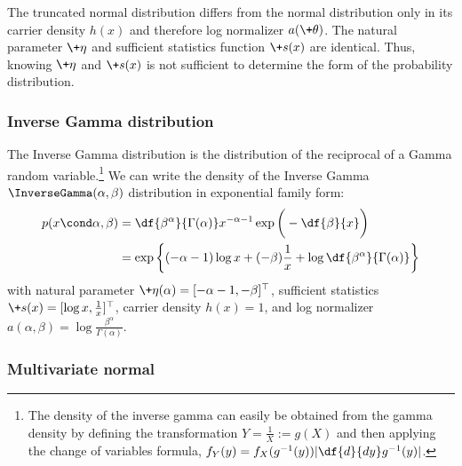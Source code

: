 \documentclass{article} %
\newcommand{\logNormalizerFunction}{a}
\newcommand{\sufficientStatsFunction}{\+s}
\newcommand{\carrierDensity}{h}
\newcommand{\param}{\+\theta}
\newcommand{\naturalParam}{\+\eta}
\begin{document}
\begin{remark}
The truncated normal distribution differs from the normal distribution only in its carrier density $\carrierDensity(x)$ and therefore log normalizer $\logNormalizerFunction(\param)$.  The natural parameter $\naturalParam$ and sufficient statistics function $\sufficientStatsFunction(x)$ are identical.   Thus,  knowing $\naturalParam$ and $\sufficientStatsFunction(x)$ is not sufficient to determine the form of the probability distribution.
\label{rk:truncated_normal_differs_from_normal_only_in_terms_of_carrier_density}
\end{remark}


\subsubsection{Inverse Gamma distribution}

\begin{example} 
 The Inverse Gamma distribution is the distribution of the reciprocal of a Gamma random variable.\footnote{The density of the inverse gamma can easily be obtained from the gamma density by defining the transformation $Y = \frac{1}{X} := g(X)$ and then applying the change of variables formula,  $f_Y(y) = f_X (g^{-1}(y)) | \df{d}{dy} g^{-1}(y)|$.}  We can write the density of the Inverse Gamma $\InverseGamma(\alpha,  \beta)$ distribution in exponential family form:
\begin{align*}
p (x \cond \alpha,  \beta) &= \df{\beta^\alpha}{ \Gamma (\alpha) } x^{-\alpha -1} \exp \bigg(- \df{\beta}{x} \bigg) \\
&= \exp \bigg\{ (-\alpha - 1) \log x + (- \beta) \frac{1}{x} + \log \df{\beta^\alpha}{\Gamma(\alpha)} \bigg\}
\end{align*}
with natural parameter $\naturalParam(\alpha) = [-\alpha-1,  -\beta]^\top$, sufficient statistics $\sufficientStatsFunction(x) = [\log x ,  \frac{1}{x}]^\top$, carrier density $\carrierDensity(x)=1$, and log normalizer $a(\alpha,  \beta) =  \log \frac{\beta^\alpha}{\Gamma(\alpha)} $. 
\label{ex:inverse_gamma_as_ef}
\end{example} 

\subsubsection{Multivariate normal}
\end{document}

